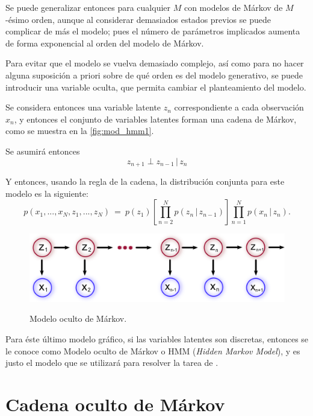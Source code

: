Se puede generalizar entonces para cualquier $M$ con modelos de Márkov de $M$-ésimo orden, aunque al considerar demasiados estados previos se puede complicar de más el modelo; pues el número de parámetros implicados aumenta de forma exponencial al orden del modelo de Márkov.

Para evitar que el modelo se vuelva demasiado complejo, así como para no hacer alguna suposición a priori sobre de qué orden es del modelo generativo, se puede introducir una variable oculta, que permita cambiar el planteamiento del modelo. 

Se considera entonces una variable latente $z_n$ correspondiente a cada  observación $x_n$, y entonces el conjunto de variables latentes forman una cadena de Márkov, como se muestra en la \autoref{fig:mod_hmm1}.

Se asumirá entonces 
\begin{equation}
\label{eqn:2-6}
z_{n+1} \perp z_{n-1} \,|\, z_{n}
\end{equation}

Y entonces, usando la regla de la cadena, la distribución conjunta para este modelo es la siguiente: 
\begin{equation}
\label{eqn:2-7}
p(x_1, ..., x_N, z_1, ..., z_N) ~=~ 
        p(z_1) \left [ \prod_{n=2}^N p(z_n \,|\, z_{n-1}) \right ] 
\prod_{n=1}^N p(x_n \,|\, z_{n}).
\end{equation}

\begin{figure}[hbt]
        \myfloatalign
        {\includegraphics[width=0.8\linewidth]{gfx/chap2/mod-hmm1}}
        \caption{Modelo oculto de Márkov.}
        \label{fig:mod_hmm1}
\end{figure}

Para éste último modelo gráfico, si las variables latentes son discretas, entonces se le conoce como Modelo oculto de Márkov o HMM (\textit{Hidden Markov Model}), y es justo el modelo que se utilizará para resolver la tarea de \sd.

\section{Cadena oculto de Márkov}

